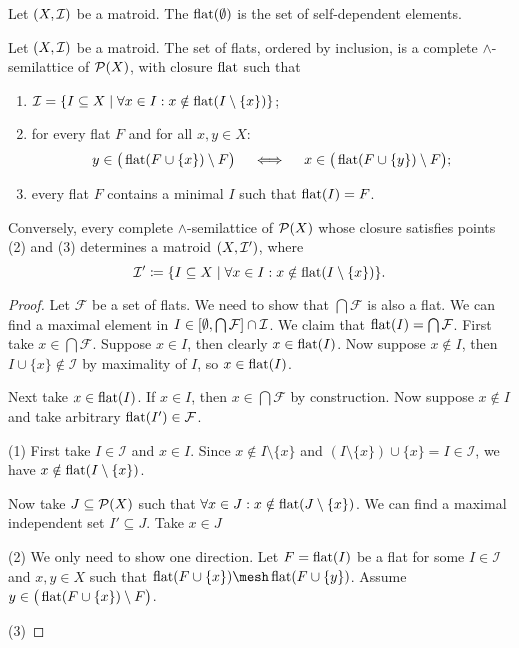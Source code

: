 \begin{lemma}
Let $\sSet{X,\mathcal{I}}$ be a matroid. The $\operatorname{flat}(\emptyset)$ is the set of self-dependent elements.
\end{lemma}

\begin{proposition}
Let $\sSet{X, \mathcal{I}}$ be a matroid. The set of flats, ordered by inclusion, is a complete $\wedge$-semilattice of $\operatorname{\mathcal{P}}(X)$, with closure $\operatorname{flat}$ such that
\begin{enumerate}
\item $\mathcal{I} = \setbuilder{I\subseteq X}{\forall x\in I: x\notin \mflat(I\setminus\{x\})}$;
\item for every flat $F$ and for all $x,y\in X$:
\[ y\in \big(\operatorname{flat}(F\cup \{x\})\setminus F\big) \quad\iff\quad x\in \big(\operatorname{flat}(F\cup \{y\})\setminus F\big); \]
\item every flat $F$ contains a minimal $I$ such that $\operatorname{flat}(I) = F$.
\end{enumerate}
Conversely, every complete $\wedge$-semilattice of $\operatorname{\mathcal{P}}(X)$ whose closure satisfies points (2) and (3) determines a matroid $\sSet{X, \mathcal{I}'}$, where
\[ \mathcal{I}' \defeq \setbuilder{I\subseteq X}{\forall x\in I: x\notin \mflat(I\setminus\{x\})}. \]
\end{proposition}
\begin{proof}
Let $\mathcal{F}$ be a set of flats. We need to show that $\bigcap \mathcal{F}$ is also a flat. We can find a maximal element in $I \in \interval{\emptyset, \bigcap \mathcal{F}}\cap \mathcal{I}$. We claim that $\operatorname{flat}(I) = \bigcap \mathcal{F}$. First take $x\in \bigcap \mathcal{F}$. Suppose $x\in I$, then clearly $x\in \operatorname{flat}(I)$. Now suppose $x\notin I$, then $I\cup \{x\}\notin \mathcal{I}$ by maximality of $I$, so $x\in \operatorname{flat}(I)$.

Next take $x\in \operatorname{flat}(I)$. If $x\in I$, then $x\in \bigcap \mathcal{F}$ by construction. Now suppose $x\notin I$ and take arbitrary $\operatorname{flat}(I')\in \mathcal{F}$.

(1) First take $I\in \mathcal{I}$ and $x\in I$. Since $x\notin I\setminus\{x\}$ and $(I\setminus\{x\})\cup \{x\} = I\in \mathcal{I}$, we have $x\notin \operatorname{flat}(I\setminus\{x\})$.

Now take $J\subseteq \operatorname{\mathcal{P}}(X)$ such that $\forall x\in J: x\notin \operatorname{flat}(J\setminus \{x\})$. We can find a maximal independent set $I'\subseteq J$. Take $x\in J$ 

(2) We only need to show one direction. Let $F = \operatorname{flat}(I)$ be a flat for some $I\in \mathcal{I}$ and $x,y\in X$ such that $\mflat(F\cup \{x\})\mesh \mflat(F\cup \{y\})$. Assume $y\in \big(\operatorname{flat}(F\cup \{x\})\setminus F\big)$.

(3)
\end{proof}

